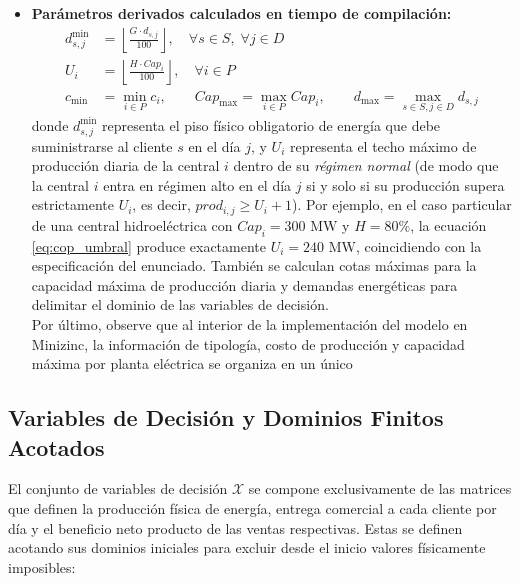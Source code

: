 \begin{itemize}
    Adicionalmente, a partir de los parámetros principales se calculan valores de referencia para facilitar la definición de restricciones y permitir la acotación de los dominios de las variables de decisión:
    
    \item \textbf{Parámetros derivados calculados en tiempo de compilación:}
    \begin{align}
        d^{\min}_{s,j} &= \left\lfloor \frac{G \cdot d_{s,j}}{100} \right\rfloor, \quad \forall s \in S, \; \forall j \in D \label{eq:cop_dmin} \\
        U_i &= \left\lfloor \frac{H \cdot Cap_i}{100} \right\rfloor, \quad \forall i \in P \label{eq:cop_umbral} \\
        c_{\min} &= \min_{i \in P} c_i, \qquad Cap_{\max} = \max_{i \in P} Cap_i, \qquad d_{\max} = \max_{s \in S, j \in D} d_{s,j} \label{eq:cop_extremos}
    \end{align}
    donde $d^{\min}_{s,j}$ representa el piso físico obligatorio de energía que debe suministrarse al cliente $s$ en el día $j$, y $U_i$ representa el techo máximo de producción diaria de la central $i$ dentro de su \emph{régimen normal} (de modo que la central $i$ entra en régimen alto en el día $j$ si y solo si su producción supera estrictamente $U_i$, es decir, $prod_{i,j} \ge U_i + 1$). Por ejemplo, en el caso particular de una central hidroeléctrica con $Cap_i = 300\text{ MW}$ y $H = 80\%$, la ecuación \eqref{eq:cop_umbral} produce exactamente $U_i = 240\text{ MW}$, coincidiendo con la especificación del enunciado. También se calculan cotas máximas para la capacidad máxima de producción diaria y demandas energéticas para delimitar el dominio de las variables de decisión.\\

    Por último, observe que al interior de la implementación del modelo en Minizinc, la información de tipología, costo de producción y capacidad máxima por planta eléctrica se organiza en un único 
\end{itemize}

\subsection{Variables de Decisión y Dominios Finitos Acotados}

El conjunto de variables de decisión $\mathcal{X}$ se compone exclusivamente de las matrices que definen la producción física de energía, entrega comercial a cada cliente por día y  el beneficio neto producto de las ventas respectivas. Estas se definen acotando sus dominios iniciales para excluir desde el inicio valores físicamente imposibles:

